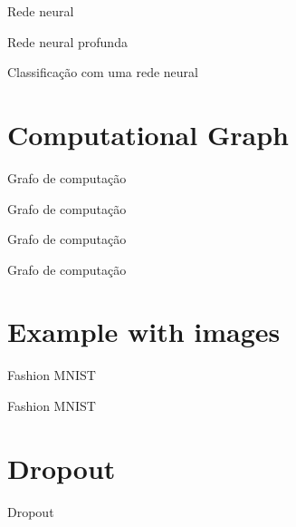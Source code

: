 \documentclass[10pt]{beamer}
\begin{document}
\begin{frame}{Rede neural}

\end{frame}

\begin{frame}{Rede neural profunda}

\end{frame}


\begin{frame}{Classificação com uma rede neural}

\end{frame}

\section{Computational Graph}

\begin{frame}[fragile]{Grafo de computação}

\end{frame}

\begin{frame}[fragile]{Grafo de computação}

\end{frame}


\begin{frame}[fragile]{Grafo de computação}

\end{frame}

\begin{frame}[fragile]{Grafo de computação}

\end{frame}

\section{Example with images}


\begin{frame}{Fashion MNIST}

\end{frame}

\begin{frame}{Fashion MNIST}

\end{frame}


\section{Dropout}


\begin{frame}[fragile]{Dropout}

\end{frame}
\end{document}
